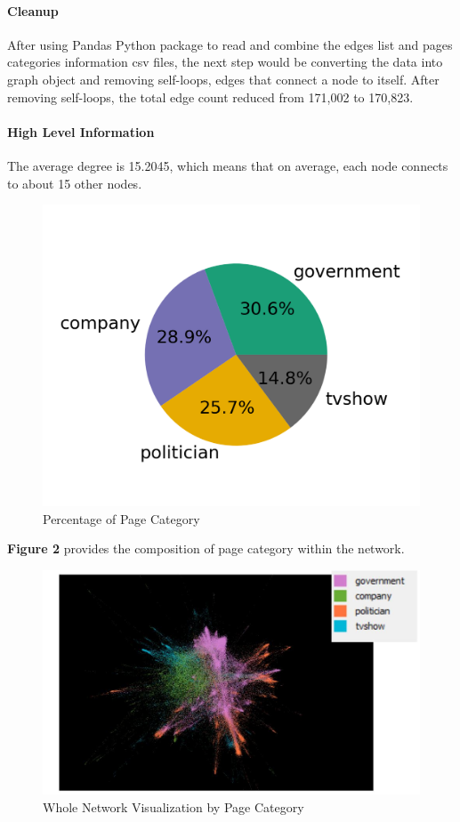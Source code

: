 \documentclass[11pt,twocolumn]{article}
\begin{document}
\paragraph{Cleanup}
After using Pandas Python package to read and combine the edges list and pages categories information csv files, the next step would be converting the data into graph object and removing self-loops, edges that connect a node to itself. After removing self-loops, the total edge count reduced from 171,002 to 170,823.

\paragraph{High Level Information} 
The average degree is 15.2045, which means that on average, each node connects to about 15 other nodes. 

\begin{figure}[hbt!]
\includegraphics[scale=0.2]{pie_chart_category.png} 
\caption{Percentage of Page Category}
\end{figure}

\textbf{Figure 2} provides the composition of page category within the network.


\begin{figure}[hbt!]
\includegraphics[scale=0.35]{gephi_whole_network_composition.JPG} 
\caption{Whole Network Visualization by Page Category}
\end{figure}
\end{document}
